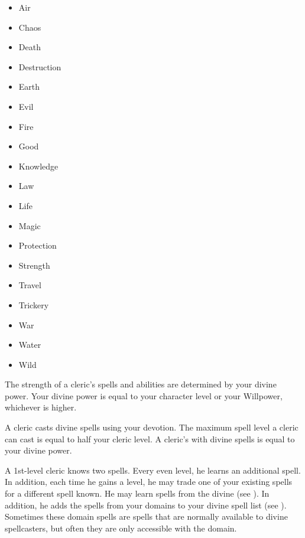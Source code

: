         \begin{itemize}
            \item{Air}
            \item{Chaos}
            \item{Death}
            \item{Destruction}
            \item{Earth}
            \item{Evil}
            \item{Fire}
            \item{Good}
            \item{Knowledge}
            \item{Law}
            \item{Life}
            \item{Magic}
            \item{Protection}
            \item{Strength}
            \item{Travel}
            \item{Trickery}
            \item{War}
            \item{Water}
            \item{Wild}
        \end{itemize}

        The strength of a cleric's spells and abilities are determined by your divine power.
        Your divine power is equal to your character level or your Willpower, whichever is higher.

        A cleric casts divine spells using your devotion.
        The maximum spell level a cleric can cast is equal to half your cleric level.
        A cleric's  with divine spells is equal to your divine power.

        A 1st-level cleric knows two spells.
        Every even level, he learns an additional spell.
        In addition, each time he gains a level, he may trade one of your existing spells for a different spell known.
        He may learn spells from the divine  (see ).
        In addition, he adds the spells from your domains to your divine spell list (see ).
        Sometimes these domain spells are spells that are normally available to divine spellcasters, but often they are only accessible with the domain.

